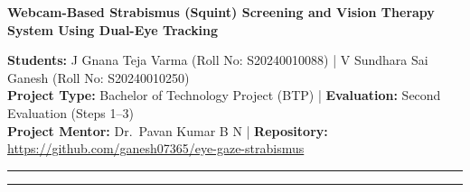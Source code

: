 \documentclass[11pt,a4paper]{article}
\begin{document}
\begin{center}
    {\LARGE \bfseries Webcam-Based Strabismus (Squint) Screening and Vision Therapy System Using Dual-Eye Tracking\par}
    \vspace{6pt}
    {\small
    \textbf{Students:} J Gnana Teja Varma (Roll No: S20240010088) \quad | \quad V Sundhara Sai Ganesh (Roll No: S20240010250) \\
    \textbf{Project Type:} Bachelor of Technology Project (BTP) \quad | \quad \textbf{Evaluation:} Second Evaluation (Steps 1--3) \\
    \textbf{Project Mentor:} Dr.\ Pavan Kumar B N \quad | \quad \textbf{Repository:} \url{https://github.com/ganesh07365/eye-gaze-strabismus}
    \par}
\end{center}
\vspace{2pt}
\hrule
\vspace{6pt}

\begin{abstract}
\noindent Strabismus (ocular misalignment or squint) affects 2--4\% of children worldwide and causes irreversible amblyopia (lazy eye) and permanent loss of depth perception if undetected early. Conventional screening requires pediatric ophthalmologists, optical prism bars, and manual occluders, limiting accessibility in schools and rural clinics, while commercial infrared eye-trackers cost over \$1,000 and standard gaze CNNs merge both eyes into one coordinate. This project presents a software-only, real-time strabismus screening pipeline operating at 30~FPS on a standard 720p laptop webcam and CPU without discrete GPUs. Using MediaPipe 478-point landmarks, 3D head-pose decoupling, and a 11.7~mm anatomical iris ruler with spherical eyeball kinematics, the system tracks both eyes independently in clinical Prism Diopters ($\Delta\text{PD}$). Completed through Steps 1--3, it automates condition-gated Cover-Uncover, Alternate Cover, and 9-Cardinal Gaze tests, achieving 100\% diagnostic agreement across four clinical video categories and 6/6 accuracy on the triage verification suite.
\end{abstract}
\vspace{4pt}
\hrule
\vspace{6pt}

\end{document}
